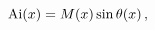 \[\mathop{\mathrm{Ai}\/}\nolimits\!\left(x\right)=\mathop{M\/}\nolimits\!\left(x%
\right)\mathop{\sin\/}\nolimits\mathop{\theta\/}\nolimits\!\left(x\right),\]